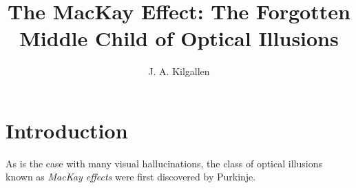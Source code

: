\documentclass[english]{article}
\begin{document}
\title{The MacKay Effect: The Forgotten Middle Child of Optical Illusions}
\author{J. A. Kilgallen}
\maketitle

\section[short]{Introduction}
As is the case with many visual hallucinations, the class of optical illusions known as \emph{MacKay effects} were first discovered by Purkinje. 
\end{document}
